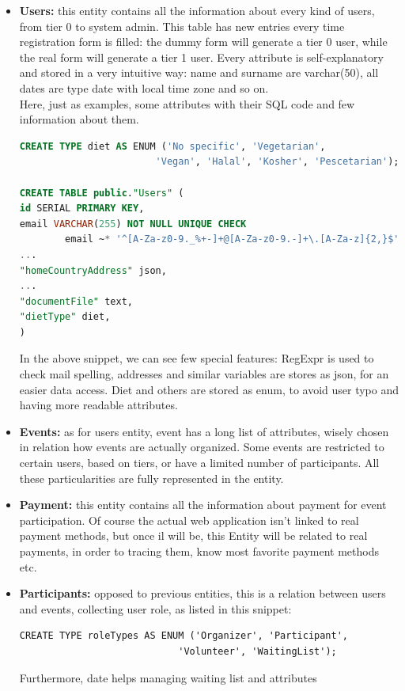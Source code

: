 \begin{itemize}
    \item \textbf{Users:} this entity contains all the information about every kind of users, from
    tier 0 to system admin. This table has new entries every time registration form is filled: the dummy
    form will generate a tier 0 user, while the real form will generate a tier 1 user. Every attribute 
    is self-explanatory and stored in a very intuitive way: name and surname are varchar(50), all dates
    are type date with local time zone and so on.\\
    Here, just as examples, some attributes with their SQL code and few information about them.
\begin{lstlisting}[language=SQL]
CREATE TYPE diet AS ENUM ('No specific', 'Vegetarian',
                        'Vegan', 'Halal', 'Kosher', 'Pescetarian');

CREATE TABLE public."Users" (
id SERIAL PRIMARY KEY,
email VARCHAR(255) NOT NULL UNIQUE CHECK 
        email ~* '^[A-Za-z0-9._%+-]+@[A-Za-z0-9.-]+\.[A-Za-z]{2,}$'),
...
"homeCountryAddress" json,
...
"documentFile" text,
"dietType" diet,
)
\end{lstlisting}
    In the above snippet, we can see few special features: RegExpr is used to check mail spelling,
    addresses and similar variables are stores as json, for an easier data access. Diet and others
    are stored as enum, to avoid user typo and having more readable attributes. %
    \item \textbf{Events:} as for users entity, event has a long list of attributes, wisely chosen
    in relation how events are actually organized. Some events are restricted to certain users, based
    on tiers, or have a limited number of participants. All these particularities are fully represented
    in the entity.
    \item \textbf{Payment:} this entity contains all the information about payment for event participation.
    Of course the actual web application isn't linked to real payment methods, but once il will be, this Entity
    will be related to real payments, in order to tracing them, know most favorite payment methods etc.
    \item \textbf{Participants:} opposed to previous entities, this is a relation between users and events,
    collecting user role, as listed in this snippet:
\begin{lstlisting}
CREATE TYPE roleTypes AS ENUM ('Organizer', 'Participant',
                            'Volunteer', 'WaitingList');
\end{lstlisting}
    Furthermore, date helps managing waiting list and attributes %
\end{itemize}